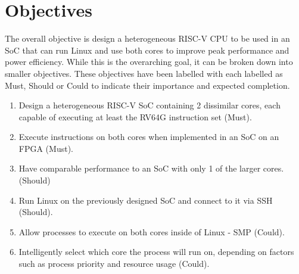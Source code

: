 \documentclass[a4paper,fleqn,11pt]{article}
\begin{document}
\section{Objectives}
The overall objective is design a heterogeneous RISC-V CPU to be used in an SoC that can run Linux and use both cores to improve peak performance and power efficiency. While this is the overarching goal, it can be broken down into smaller objectives. These objectives have been labelled with each labelled as Must, Should or Could to indicate their importance and expected completion.
\begin{enumerate}
    \item Design a heterogeneous RISC-V SoC containing 2 dissimilar cores, each capable of executing at least the RV64G instruction set (Must).
    \item Execute instructions on both cores when implemented in an SoC on an FPGA (Must).
    \item Have comparable performance to an SoC with only 1 of the larger cores. (Should)
    \item Run Linux on the previously designed SoC and connect to it via SSH (Should).
    \item Allow processes to execute on both cores inside of Linux - SMP (Could).
    \item Intelligently select which core the process will run on, depending on factors such as process priority and resource usage (Could).
\end{enumerate}

\clearpage
\end{document}
